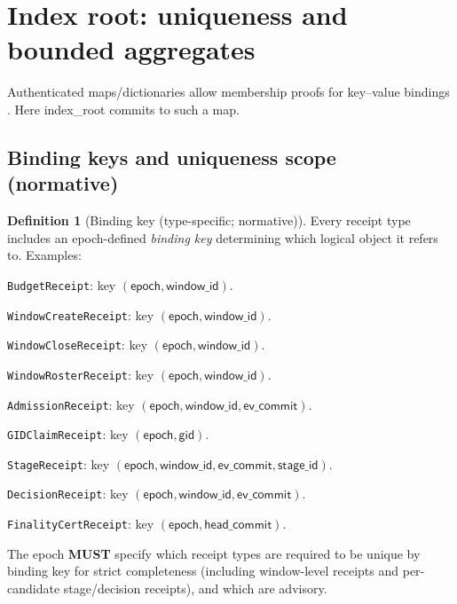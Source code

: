 \documentclass[11pt]{article}
\newcommand{\MUST}{\textbf{MUST}}
\newcommand{\code}[1]{\texttt{#1}}
\newcommand{\term}[1]{\emph{#1}}
\newcommand{\1}{\mathbf{1}}
\theoremstyle{definition}
\newtheorem{definition}{Definition}
\theoremstyle{plain}
\begin{document}
\section{Index root: uniqueness and bounded aggregates}
\label{sec:index}

Authenticated maps/dictionaries allow membership proofs for key--value bindings \cite{TamassiaADS2003,MelaraCONIKS2015}. Here \textsf{index\_root} commits to such a map.

\subsection{Binding keys and uniqueness scope (normative)}

\begin{definition}[Binding key (type-specific; normative)]
\label{def:bindkey}
Every receipt type includes an epoch-defined \term{binding key} determining which logical object it refers to. Examples:
\begin{tightitemize}
\item \code{BudgetReceipt}: key $(\textsf{epoch},\textsf{window\_id})$.
\item \code{WindowCreateReceipt}: key $(\textsf{epoch},\textsf{window\_id})$.
\item \code{WindowCloseReceipt}: key $(\textsf{epoch},\textsf{window\_id})$.
\item \code{WindowRosterReceipt}: key $(\textsf{epoch},\textsf{window\_id})$.
\item \code{AdmissionReceipt}: key $(\textsf{epoch},\textsf{window\_id},\textsf{ev\_commit})$.
\item \code{GIDClaimReceipt}: key $(\textsf{epoch},\textsf{gid})$.
\item \code{StageReceipt}: key $(\textsf{epoch},\textsf{window\_id},\textsf{ev\_commit},\textsf{stage\_id})$.
\item \code{DecisionReceipt}: key $(\textsf{epoch},\textsf{window\_id},\textsf{ev\_commit})$.
\item \code{FinalityCertReceipt}: key $(\textsf{epoch},\textsf{head\_commit})$.
\end{tightitemize}
The epoch \MUST{} specify which receipt types are required to be unique by binding key for strict completeness (including window-level receipts and per-candidate stage/decision receipts), and which are advisory.
\end{definition}
\end{document}
